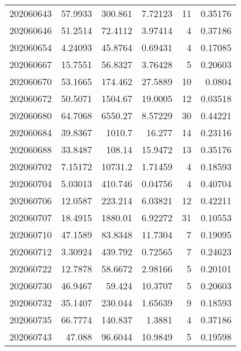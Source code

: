 \begin{tabular}{rrrrrr}
 202060643 &         57.9933  &      300.861  &            7.72123 &          11 & 0.35176 \\
 202060646 &         51.2514  &       72.4112 &            3.97414 &           4 & 0.37186 \\
 202060654 &          4.24093 &       45.8764 &            0.69431 &           4 & 0.17085 \\
 202060667 &         15.7551  &       56.8327 &            3.76428 &           5 & 0.20603 \\
 202060670 &         53.1665  &      174.462  &           27.5889  &          10 & 0.0804  \\
 202060672 &         50.5071  &     1504.67   &           19.0005  &          12 & 0.03518 \\
 202060680 &         64.7068  &     6550.27   &            8.57229 &          30 & 0.44221 \\
 202060684 &         39.8367  &     1010.7    &           16.277   &          14 & 0.23116 \\
 202060688 &         33.8487  &      108.14   &           15.9472  &          13 & 0.35176 \\
 202060702 &          7.15172 &    10731.2    &            1.71459 &           4 & 0.18593 \\
 202060704 &          5.03013 &      410.746  &            0.04756 &           4 & 0.40704 \\
 202060706 &         12.0587  &      223.214  &            6.03821 &          12 & 0.42211 \\
 202060707 &         18.4915  &     1880.01   &            6.92272 &          31 & 0.10553 \\
 202060710 &         47.1589  &       83.8348 &           11.7304  &           7 & 0.19095 \\
 202060712 &          3.30924 &      439.792  &            0.72565 &           7 & 0.24623 \\
 202060722 &         12.7878  &       58.6672 &            2.98166 &           5 & 0.20101 \\
 202060730 &         46.9467  &       59.424  &           10.3707  &           5 & 0.20603 \\
 202060732 &         35.1407  &      230.044  &            1.65639 &           9 & 0.18593 \\
 202060735 &         66.7774  &      140.837  &            1.3881  &           4 & 0.37186 \\
 202060743 &         47.088   &       96.6044 &           10.9849  &           5 & 0.19598 \\

\end{tabular}
